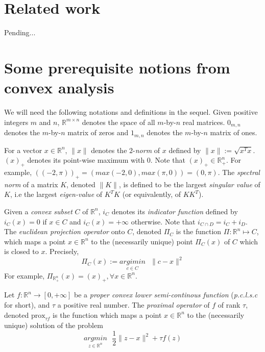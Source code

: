 \documentclass{article} %
\begin{document}

\section{Related work}
\label{sec:related_work}

Pending...

\section{Some prerequisite notions from convex analysis}
\label{sec:notation}
We will need the following notations and definitions in the sequel. Given positive integers $m$ and $n$, $\mathbb{R}^{m \times n}$ denotes
the space of all $m$-by-$n$ real matrices. $0_{m,n}$ denotes the $m$-by-$n$ matrix of zeros and $1_{m,n}$ denotes the $m$-by-$n$ matrix of ones.

For a vector $x \in \mathbb{R}^n$, $\|x\|$ denotes the $2$-\textit{norm} of $x$ defined by $\|x\| := \sqrt{x^Tx}$.
$(x)_+$ denotes its point-wise maximum with 0. Note that $(x)_+ \in \mathbb{R}^n_+$.
For example, $((-2, \pi))_+ = (max(-2, 0), max(\pi, 0)) = (0, \pi)$. The \textit{spectral norm} of a matrix $K$,
denoted $\|K\|$, is defined to be the largest \textit{singular value} of $K$, i.e the largest \textit{eigen-value} of $K^TK$ (or equivalently, of $KK^T$).

Given a \textit{convex subset} $C$ of $\mathbb{R}^n$, $i_C$ denotes its \textit{indicator function} defined by
$i_C(x) = 0$ if $x \in C$ and $i_C(x) = +\infty$ otherwise. Note that $i_{C \cap D} = i_C + i_D$. The \textit{euclidean projection operator} onto $C$, denoted $\Pi_C$ is the function
$\Pi: \mathbb{R}^n \mapsto C$, which maps a point $x \in \mathbb{R}^n$ to the (necessarily unique) point $\Pi_C(x)$ of $C$ which is closed to $x$. Precisely,
\begin{equation}
  \Pi_C(x) := \underset{c \in C}{argimin}\text{ }\|c - x\|^2
\end{equation}
For example, $\Pi_{\mathbb{R}^n_+}(x) = (x)_+, \forall x \in \mathbb{R}^n$.

Let $f : \mathbb{R}^n \rightarrow [0, +\infty]$ be a \textit{proper convex lower semi-continous function} (\textit{p.c.l.s.c} for short), and $\tau$ a positive real number. The \textit{proximal operator} of $f$ of rank $\tau$,
denoted $\text{prox}_{\tau f}$ is the function which maps a point $x \in \mathbb{R}^n$ to the (necessarily unique) solution of the problem
\begin{equation}
  \underset{z \in \mathbb{R}^n}{argmin}\text{ }\frac{1}{2}\|z - x\|^2 + \tau f(z)
\end{equation}
\end{document}
